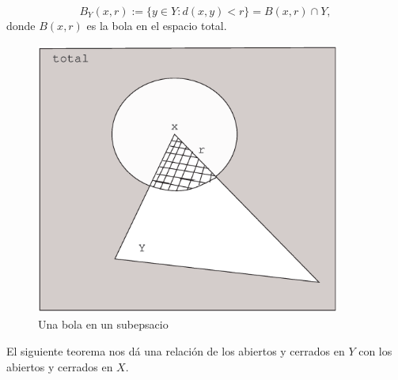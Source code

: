 \begin{equation}\label{eq,bolasub}
    B_Y(x,r):=\{y\in Y: d(x,y)<r\}=B(x,r)\cap Y,
\end{equation}
donde $B(x,r)$ es la bola en el espacio total.
\begin{figure}[h]
\begin{center}
    \includegraphics[height=9cm, width=10cm]{bolasub.eps}
    \caption{Una bola en un subepsacio}\label{fig,bolasub}
\end{center}
\end{figure}


El siguiente teorema nos d\'a una relaci\'on de los abiertos y
cerrados en $Y$ con los abiertos y cerrados en $X$.

